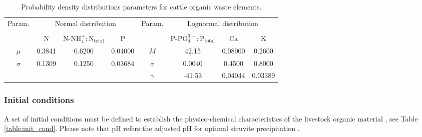 \documentclass[10pt,a4paper]{article}
\begin{document}
\begin{table}[H] 
	\centering
	\caption{Probability density distributions parameters for cattle organic waste elements.} \label{table:PDD_paramenters}
	\begin{tabular}{c c c c c c c c} %
		\toprule
		\multicolumn{1}{c}{Param.}&\multicolumn{3}{c}{Normal distribution}&\multicolumn{1}{c}{Param.}&\multicolumn{3}{c}{Lognormal distribution} \\ \cmidrule(lr){2-4}\cmidrule(lr){6-8}%
		\\[-1em]
		&N		&$\text{N-NH}^{+}_{4}:\text{N}_{\text{total}}$		&P	&		&$\text{P-PO}_{4}^{3-}:\text{P}_{\text{total}}$		&$\text{Ca}$		&$\text{K}$ 		\\ \midrule
		$\mu$		&0.3841			&0.6200			&0.04000	&$M$		&42.15		&0.08000	&0.2600			\\ 
		$\sigma$	&0.1309			&0.1250			&0.03684	&$\sigma$		&0.0040		&0.4500		&0.8000		\\ 
		&				&				&			&$\gamma$		&-41.53		&0.04044	&0.03389		\\ 
		\bottomrule
	\end{tabular}
\end{table}

\subsubsection{Initial conditions} \label{Initial parameters}
A set of initial conditions must be defined to establish the physico-chemical characteristics of the livestock organic material , see Table \ref{table:init_cond}. Please note that pH refers the adjusted pH for optimal struvite precipitation . 
\end{document}
